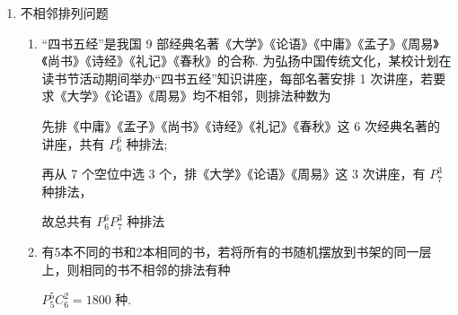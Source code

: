 \begin{enumerate}
\begin{enumerate}
\begin{jieda}
            第一种情况:景海鹏站最右边，共有 $P_{4}^{4} = {24}$ 种排法；
            
            第二种情况:景海鹏不站最左边与最右边，则共有 $P_{3}^{1}P_{3}^{1}P_{3}^{3} = {54}$ 种排法，
            
            故总共有 $2 \times  \left( {{24} + {54}}\right)  = {156}$ 种排法.
        \end{jieda}
        
        \item 为积极落实“双减”政策，丰富学生的课外活动，某校开设了陶艺、 剪纸、插花等 5 门课程.分别安排在周一到周五，每天一节，其中陶艺课不排在周一，剪纸和插花课相邻的课程的安排方案种数为 
        \begin{jieda}
            剪纸和插花课相邻的安排方法有 $P_{4}^{4}P_{2}^{2} = {48}$ 种,
            
            剪纸和插花课相邻且陶艺课排在周一的安排方法有 $P_{3}^{3}P_{2}^{2} = {12}$ ,
            
            故陶艺课不排在周一,剪纸和插花课相邻的课程安排方法一共有 ${48} - {12} = {36}$
        \end{jieda}
    \end{enumerate}
    \item 不相邻排列问题
    \begin{enumerate}
        \item “四书五经”是我国 9 部经典名著《大学》《论语》《中庸》《孟子》《周易》《尚书》《诗经》《礼记》《春秋》的合称. 为弘扬中国传统文化，某校计划在读书节活动期间举办“四书五经”知识讲座，每部名著安排 1 次讲座，若要求《大学》《论语》《周易》均不相邻，则排法种数为
        \begin{jieda}
            先排《中庸》《孟子》《尚书》《诗经》《礼记》《春秋》这 6 次经典名著的讲座，共有 $P_{6}^{6}$ 种排法;
            
            再从 7 个空位中选 3 个，排《大学》《论语》《周易》这 3 次讲座，有 $P_{7}^{3}$ 种排法，
            
            故总共有 $P_{6}^{6}P_{7}^{3}$ 种排法
        \end{jieda}

        
        \item 有5本不同的书和2本相同的书，若将所有的书随机摆放到书架的同一层上，则相同的书不相邻的排法有种
        \begin{jieda}
            $P_{5}^{5}C_6^2 = 1800$ 种.
        \end{jieda}
        

\end{enumerate}
\end{enumerate}
